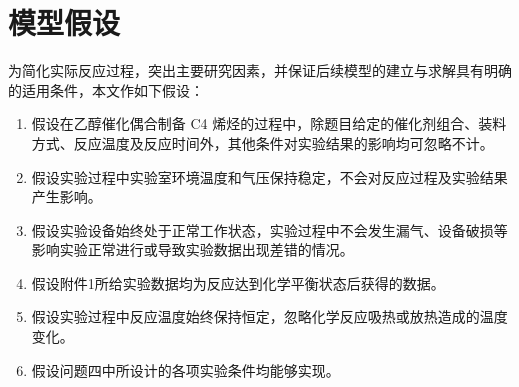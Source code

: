 \section{模型假设}

为简化实际反应过程，突出主要研究因素，并保证后续模型的建立与求解具有明确的适用条件，本文作如下假设：

\begin{enumerate}
    \item 假设在乙醇催化偶合制备 C4 烯烃的过程中，除题目给定的催化剂组合、装料方式、反应温度及反应时间外，其他条件对实验结果的影响均可忽略不计。

    \item 假设实验过程中实验室环境温度和气压保持稳定，不会对反应过程及实验结果产生影响。

    \item 假设实验设备始终处于正常工作状态，实验过程中不会发生漏气、设备破损等影响实验正常进行或导致实验数据出现差错的情况。

    \item 假设附件1所给实验数据均为反应达到化学平衡状态后获得的数据。

    \item 假设实验过程中反应温度始终保持恒定，忽略化学反应吸热或放热造成的温度变化。

    \item 假设问题四中所设计的各项实验条件均能够实现。
\end{enumerate}
